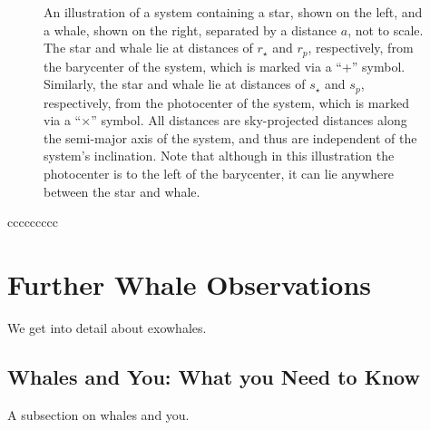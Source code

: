 \begin{figure}[h!]  %
\centering
{}
\caption[Whales are Everywhere (short caption example)]{An illustration of a system containing a star, shown on the left, and a whale, shown on the right, separated by a distance $a$, not to scale. The star and whale lie at distances of $r_{\star}$ and $r_{p}$, respectively, from the barycenter of the system, which is marked via a ``+'' symbol. Similarly, the star and whale lie at distances of $s_{\star}$ and $s_{p}$, respectively, from the photocenter of the system, which is marked via a ``$\times$'' symbol. All distances are sky-projected distances along the semi-major axis of the system, and thus are independent of the system's inclination. Note that although in this illustration the photocenter is to the left of the barycenter, it can lie anywhere between the star and whale.}
\label{whalefig1b}
\end{figure}

\tabletypesize{\scriptsize}
\begin{deluxetable}{ccccccccc}
  \tablewidth{0pt}
  \startdata
  
  
  
  
  \enddata
  \label{tab1}
\end{deluxetable}

\section{Further Whale Observations}

We get into detail about exowhales.

\subsection{Whales and You: What you Need to Know}

A subsection on whales and you.

